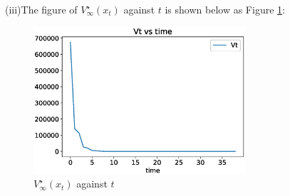 \documentclass[a4paper,11pt,reqno]{amsart}
\begin{document}
(iii)The figure of $V^{\star}_{\infty}(x_t) $ against $t$ is shown below as Figure \ref{fig:q3_iii}:
\begin{figure}[H]
    \centering
    \includegraphics[width=0.7\textwidth]{figures/q3_iii.eps}
    \caption{$V^{\star}_{\infty}(x_t) $ against $t$}
    \label{fig:q3_iii}
\end{figure}

\end{document}

